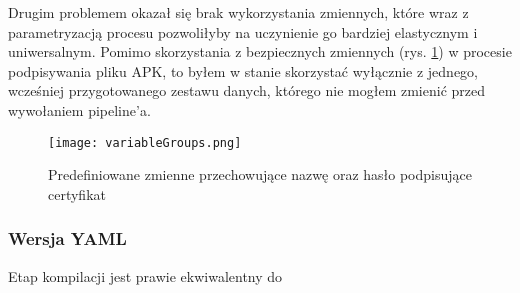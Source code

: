 Drugim problemem okazał się brak wykorzystania zmiennych, które wraz z parametryzacją procesu 
pozwoliłyby na uczynienie go bardziej elastycznym i uniwersalnym. Pomimo skorzystania z bezpiecznych 
zmiennych (rys. \ref{img:variableGroups}) w procesie podpisywania pliku APK, 
to byłem w stanie skorzystać wyłącznie z jednego, wcześniej przygotowanego zestawu danych, 
którego nie mogłem zmienić przed wywołaniem pipeline'a.

\begin{figure}[ht]
    \centering
    \texttt{[image: variableGroups.png]}
    \caption{Predefiniowane zmienne przechowujące nazwę oraz hasło podpisujące certyfikat}
    \label{img:variableGroups}
\end{figure}

\newpage

\label{javaTask}

\subsubsection{Wersja YAML}
Etap kompilacji jest prawie ekwiwalentny do 